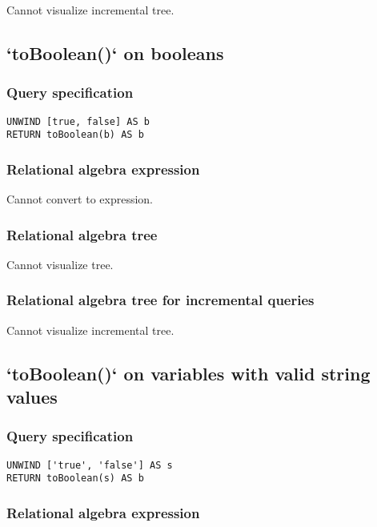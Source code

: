 Cannot visualize incremental tree.

\subsection{`toBoolean()` on booleans}

\subsubsection*{Query specification}

\begin{lstlisting}
UNWIND [true, false] AS b
RETURN toBoolean(b) AS b
\end{lstlisting}

\subsubsection*{Relational algebra expression}

Cannot convert to expression.

\subsubsection*{Relational algebra tree}

Cannot visualize tree.

\subsubsection*{Relational algebra tree for incremental queries}

Cannot visualize incremental tree.

\subsection{`toBoolean()` on variables with valid string values}

\subsubsection*{Query specification}

\begin{lstlisting}
UNWIND ['true', 'false'] AS s
RETURN toBoolean(s) AS b
\end{lstlisting}

\subsubsection*{Relational algebra expression}


